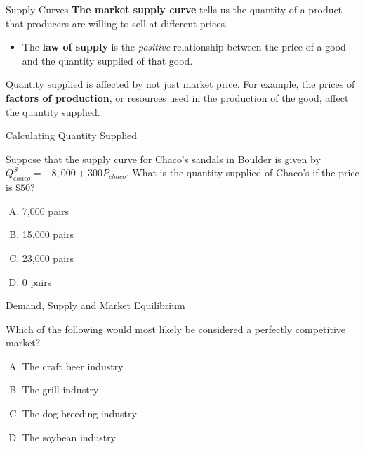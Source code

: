 \documentclass[12pt,t]{beamer}
\begin{document}
\begin{frame}{Supply Curves}
  \textbf{The market supply curve} tells us the quantity of a product that producers are willing to sell at different prices.

  \begin{itemize}
    \item The \textbf{law of supply} is the \emph{positive} relationship between the price of a good and the quantity supplied of that good.
  \end{itemize}

  \pause
  \bigskip
  Quantity supplied is affected by not just market price. For example, the prices of \textbf{factors of production}, or resources used in the production of the good, affect the quantity supplied.
\end{frame}

\begin{frame}{Calculating Quantity Supplied}

\bigskip
Suppose that the supply curve for Chaco's sandals in Boulder is given by $Q^S_{chaco} = -8,000 + 300P_{chaco}$. What is the quantity supplied of Chaco's if the price is $ \$ 50 $?

  \bigskip
  \begin{enumerate}[A)]
    \item 7,000 pairs
    \item  15,000 pairs
    \item 23,000 pairs
    \item 0 pairs
  \end{enumerate}
\end{frame}


\begin{frame}{Demand, Supply and Market Equilibrium}

\bigskip
Which of the following would most likely be considered a perfectly competitive market?

  \begin{enumerate}[A)]
    \item The craft beer industry
    \item The grill industry
    \item The dog breeding industry
    \item The soybean industry
  \end{enumerate}
\end{frame}
\end{document}
